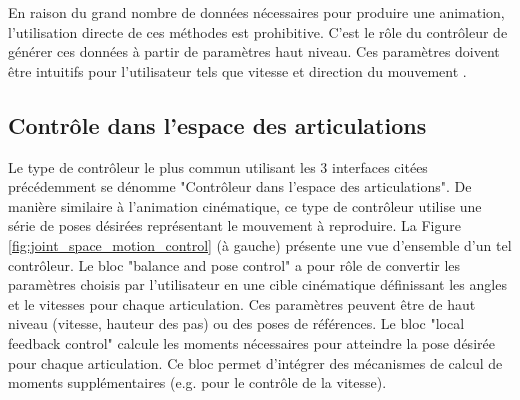 \documentclass[runningheads,a4paper]{llncs}
\begin{document}
En raison du grand nombre de données nécessaires pour produire une animation, l'utilisation directe de ces méthodes est prohibitive. C'est le rôle du contrôleur de générer ces données à partir de paramètres haut niveau. Ces paramètres doivent être intuitifs pour l'utilisateur tels que vitesse et direction du mouvement \cite{coros2010generalized}. 

\subsection{Contrôle dans l'espace des articulations} 
Le type de contrôleur le plus commun utilisant les 3 interfaces citées précédemment se dénomme "Contrôleur dans l'espace des articulations".
De manière similaire à l'animation cinématique, ce type de contrôleur utilise une série de poses désirées représentant le mouvement à reproduire. La Figure \ref{fig:joint_space_motion_control} (à gauche) présente une vue d'ensemble d'un tel contrôleur. Le bloc "balance and pose control" a pour rôle de convertir les paramètres choisis par l'utilisateur en une cible cinématique définissant les angles et le vitesses pour chaque articulation. Ces paramètres peuvent être de haut niveau (vitesse, hauteur des pas) ou des poses de références. Le bloc "local feedback control" calcule les moments nécessaires pour atteindre la pose désirée pour chaque articulation. Ce bloc permet d'intégrer des mécanismes de calcul de moments supplémentaires (e.g. pour le contrôle de la vitesse). 
\end{document}
